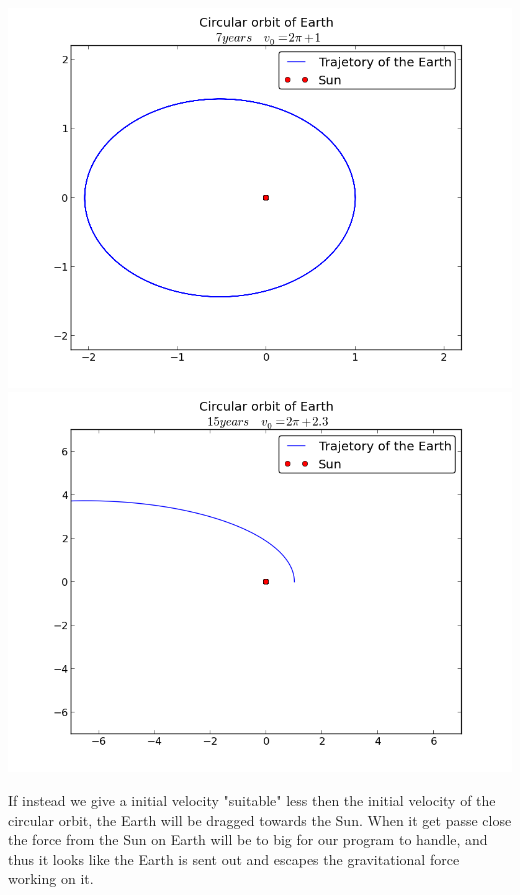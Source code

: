 \documentclass[a4paper,12pt, english]{article}
\begin{document}
\includegraphics[scale=0.5]{circular_orbit_1.png}
\includegraphics[scale=0.5]{circular_orbit_2.png}

If instead we give a initial velocity "suitable" less then the initial velocity of the circular orbit, the Earth will be dragged towards the Sun. When it get passe close the force from the Sun on Earth will be to big for our program to handle, and thus it looks like the Earth is sent out and escapes the gravitational force working on it.     
\end{document}
